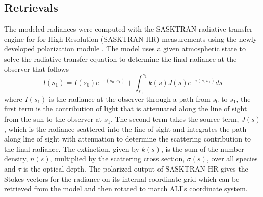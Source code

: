 \documentclass[12pt]{article}
\begin{document}
\subsection{Retrievals}
\label{sec:retrievals}

The modeled radiances were computed with the SASKTRAN radiative transfer engine \citep{Bourassa2008a} for for High Resolution (SASKTRAN-HR) \citep{Zawada2015} measurements using the newly developed polarization module \citep{Dueck2015}. The model uses a given atmospheric state to solve the radiative transfer equation to determine the final radiance at the observer that follows
\begin{equation}
    I(s_{1}) = I(s_{0})e^{-\tau(s_{0}, s_{1})}+\int^{s_{1}}_{s_{0}}k(s)J(s)e^{-\tau(s, s_{1})}ds
\end{equation}
where $I(s_{1})$ is the radiance at the observer through a path from $s_{0}$ to $s_{1}$, the first term is the contribution of light that is attenuated along the line of sight from the sun to the observer at $s_{1}$. The second term takes the source term, $J(s)$, which is the radiance scattered into the line of sight and integrates the path along line of sight with attenuation to determine the scattering contribution to the final radiance. The extinction, given by $k(s)$, is the sum of the number density, $n(s)$, multiplied by the scattering cross section, $\sigma(s)$, over all species and $\tau$ is the optical depth. The polarized output of SASKTRAN-HR gives the Stokes vectors for the radiance on its internal coordinate grid which can be retrieved from the model and then rotated to match ALI's coordinate system.
\end{document}
